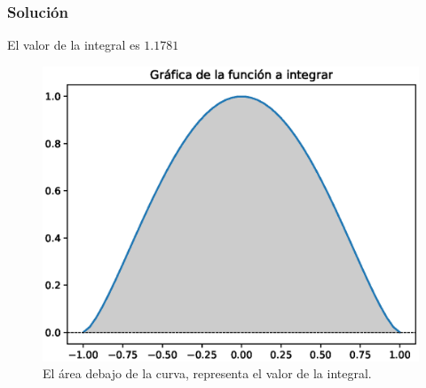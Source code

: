 \begin{frame}
\frametitle{Solución}
El valor de la integral es $1.1781$
\begin{figure}
  \centering
  \includegraphics[scale=0.5]{Imagenes/cuadratura_01.eps}
  \caption{El área debajo de la curva, representa el valor de la integral.}
\end{figure}
\end{frame}
